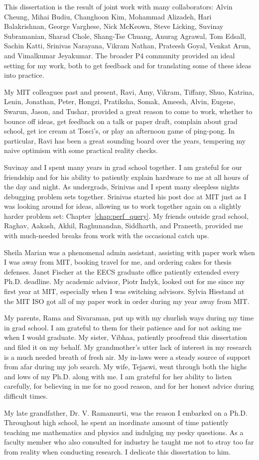This dissertation is the result of joint work with many collaborators: Alvin
Cheung, Mihai Budiu, Changhoon Kim, Mohammad Alizadeh, Hari Balakrishnan,
George Varghese, Nick McKeown, Steve Licking, Suvinay Subramanian, Sharad
Chole, Shang-Tse Chuang, Anurag Agrawal, Tom Edsall, Sachin Katti, Srinivas
Narayana, Vikram Nathan, Prateesh Goyal, Venkat Arun, and Vimalkumar Jeyakumar.
The broader P4 community provided an ideal setting for my work, both to get
feedback and for translating some of these ideas into practice. 

My MIT colleagues past and present, Ravi, Amy, Vikram, Tiffany, Shuo,
Katrina, Lenin, Jonathan, Peter, Hongzi, Pratiksha, Somak, Ameesh, Alvin,
Eugene, Swarun, Jason, and Tushar, provided a great reason to come to work, whether to bounce
off ideas, get feedback on a talk or paper draft, complain about grad school,
get ice cream at Tosci's, or play an afternoon game of ping-pong. In
particular, Ravi has been a great sounding board over the years, tempering my
naive optimism with some practical reality checks.

Suvinay and I spent many years in grad school together.  I am grateful for our
friendship and for his ability to patiently explain hardware to me at all hours
of the day and night. As undergrads, Srinivas and I spent many sleepless nights
debugging problem sets together. Srinivas started his post doc at MIT just as I
was looking around for ideas, allowing us to work together again on a slightly
harder problem set: Chapter~\ref{chap:perf_query}.  My friends outside grad school, Raghav,
Aakash, Akhil, Raghunandan, Siddharth, and Praneeth, provided me with
much-needed breaks from work with the occasional catch ups.

Sheila Marian was a phenomenal admin assistant, assisting with paper work when
I was away from MIT, booking travel for me, and ordering cakes for thesis
defenses. Janet Fischer at the EECS graduate office patiently extended every
Ph.D.  deadline. My academic advisor, Piotr Indyk, looked out for me since my
first year at MIT, especially when I was switching advisors.  Sylvia Hiestand
at the MIT ISO got all of my paper work in order
during my year away from MIT.

My parents, Rama and Sivaraman, put up with my churlish ways during my time in
grad school. I am grateful to them for their patience and for not asking me
when I would graduate. My sister, Vibhaa, patiently proofread this dissertation
and filed it on my behalf.  My
grandmother's utter lack of interest in my research is a much needed breath of
fresh air. My in-laws were a steady source of support from afar during my job
search. My wife, Tejaswi, went through both the highs and lows of my Ph.D.
along with me. I am grateful for her ability to listen carefully, for believing
in me for no good reason, and for her honest advice during difficult times. 

My late grandfather, Dr. V. Ramamurti, was the reason I embarked on a Ph.D.
Throughout high school, he spent an inordinate amount of time patiently
teaching me mathematics and physics and indulging my pesky questions. As a
faculty member who also consulted for industry he taught me not to stray too
far from reality when conducting research. I dedicate this dissertation to him.
